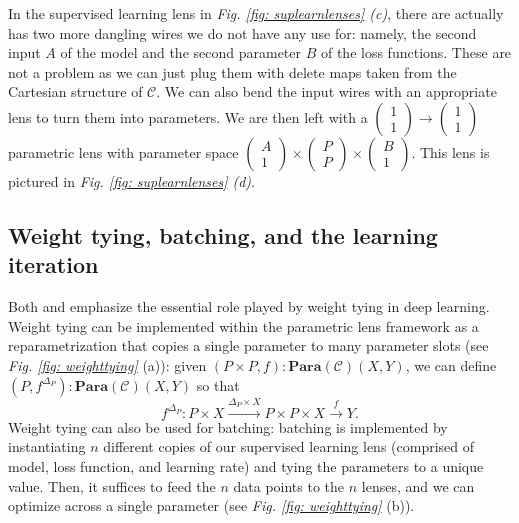 \documentclass[11pt,a4paper,openright,twoside]{report}
\theoremstyle{plain}
\theoremstyle{definition}
\begin{document}
In the supervised learning lens in \textit{Fig. \ref{fig: suplearnlenses} (c)}, there are actually has two more dangling wires we do not have any use for: namely, the second input $A$ of the model and the second parameter $B$ of the loss functions. These are not a problem as we can just plug them with delete maps taken from the Cartesian structure of $\mathcal{C}$. We can also bend the input wires with an appropriate lens to turn them into parameters. We are then left with a $\left(\begin{smallmatrix} 1 \\ 1 \end{smallmatrix}\right) \to \left(\begin{smallmatrix} 1 \\ 1 \end{smallmatrix}\right)$ parametric lens with parameter space $\left(\begin{smallmatrix} A \\ 1 \end{smallmatrix}\right) \times \left(\begin{smallmatrix} P \\ P \end{smallmatrix}\right) \times \left(\begin{smallmatrix} B \\ 1 \end{smallmatrix}\right)$. This lens is pictured in \textit{Fig. \ref{fig: suplearnlenses} (d)}.




\subsection{Weight tying, batching, and the learning iteration}

Both \cite{cruttwell2022categorical} and \cite{gavranovic2024fundamental} emphasize the essential role played by weight tying in deep learning. Weight tying can be implemented within the parametric lens framework as a reparametrization that copies a single parameter to many parameter slots (see \textit{Fig. \ref{fig: weighttying}} (a)): given $(P \times P, f): \mathbf{Para}(\mathcal{C})(X,Y)$, we can define $(P, f^{\Delta_P}): \mathbf{Para}(\mathcal{C})(X,Y)$ so that
\[f^{\Delta_P}: P \times X \stackrel{\Delta_P \times X}{\longrightarrow} P \times P \times X \stackrel{f}{\longrightarrow} Y.\]
Weight tying can also be used for batching: batching is implemented by instantiating $n$ different copies of our supervised learning lens (comprised of model, loss function, and learning rate) and tying the parameters to a unique value. Then, it suffices to feed the $n$ data points to the $n$ lenses, and we can optimize across a single parameter (see \textit{Fig. \ref{fig: weighttying}} (b)).
\end{document}
